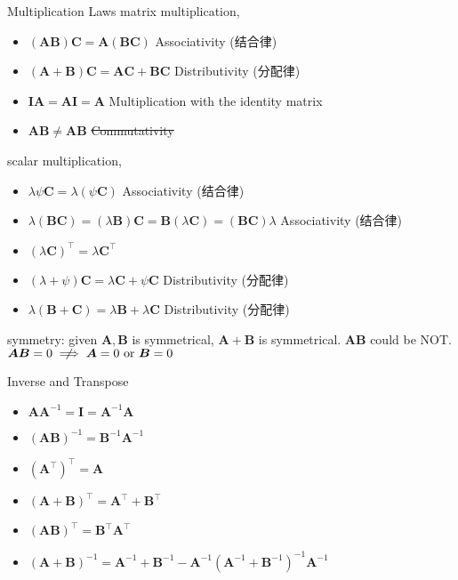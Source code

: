 \documentclass[UTF8,a4paper]{article}
\begin{document}

\begin{cheatsheetblock}{Multiplication Laws}
    matrix multiplication,
    \begin{itemize}
        \item $(\bm{A} \bm{B}) \bm{C} = \bm{A} (\bm{B} \bm{C})$ \hfill Associativity (结合律)
        \item $(\bm{A} + \bm{B}) \bm{C} = \bm{AC} + \bm{BC}$ \hfill Distributivity (分配律)
        \item $\bm{IA}=\bm{AI}=\bm{A}$ \hfill Multiplication with the identity matrix
        \item $\bm{AB} \neq \bm{AB}$ \hfill \sout{Commutativity}
    \end{itemize}
    scalar multiplication,
    \begin{itemize}
        \item $\lambda \psi \bm{C} = \lambda (\psi \bm{C})$ \hfill Associativity (结合律)
        \item $\lambda (\bm{BC}) = (\lambda \bm{B}) \bm{C} = \bm{B} (\lambda \bm{C}) = (\bm{BC})\lambda$ \hfill Associativity (结合律)
        \item $(\lambda \bm{C})^{\top} = \lambda \bm{C}^{\top}$
        \item $(\lambda + \psi) \bm{C} = \lambda\bm{C}+ \psi \bm{C}$  \hfill Distributivity (分配律)
        \item $\lambda (\bm{B} + \bm{C}) = \lambda\bm{B} +\lambda \bm{C}$  \hfill Distributivity (分配律)
    \end{itemize}
    symmetry: given $\bm{A}, \bm{B}$ is symmetrical, $\bm{A} + \bm{B}$ is symmetrical. $\bm{AB}$ could be NOT. \\
    $\bm{AB} = 0  \centernot\implies \bm{A} = 0 \text{ or } \bm{B} = 0$
\end{cheatsheetblock}

\begin{cheatsheetblock}{Inverse and Transpose}
    \begin{itemize}
        \item $\bm{A}\bm{A}^{-1} = \bm{I} = \bm{A}^{-1}\bm{A}$
        \item $(\bm{AB})^{-1} = \bm{B}^{-1} \bm{A}^{-1}$
        \item $(\bm{A}^{\top})^\top = \bm{A}$
        \item $(\bm{A} + \bm{B})^\top = \bm{A}^{\top} + \bm{B}^{\top}$
        \item $(\bm{AB})^{\top} = \bm{B}^{\top} \bm{A} ^{\top}$
        \item $(\bm{A} + \bm{B})^{-1} = \bm{A}^{-1} + \bm{B}^{-1} - \bm{A}^{-1} (\bm{A}^{-1} + \bm{B}^{-1})^{-1} \bm{A}^{-1}$
    \end{itemize}
\end{cheatsheetblock}
\end{document}
